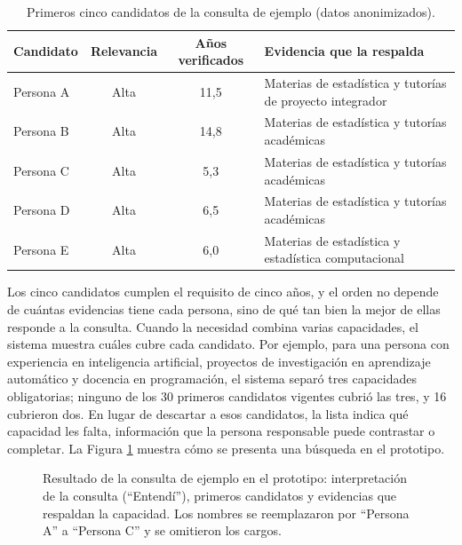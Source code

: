 \begin{table}[!htbp]
    \centering
    \caption{Primeros cinco candidatos de la consulta de ejemplo (datos anonimizados).}
    \label{tab:consulta_resultados}
    \small
    \begin{tabular}{l c c >{\raggedright\arraybackslash}p{7.4cm}}
        \toprule
        \textbf{Candidato} & \textbf{Relevancia} & \textbf{Años verificados} & \textbf{Evidencia que la respalda} \\
        \midrule
        Persona A & Alta & 11,5 & Materias de estadística y tutorías de proyecto integrador \\
        Persona B & Alta & 14,8 & Materias de estadística y tutorías académicas \\
        Persona C & Alta & 5,3 & Materias de estadística y tutorías académicas \\
        Persona D & Alta & 6,5 & Materias de estadística y tutorías académicas \\
        Persona E & Alta & 6,0 & Materias de estadística y estadística computacional \\
        \bottomrule
    \end{tabular}
\end{table}

Los cinco candidatos cumplen el requisito de cinco años, y el orden no depende de cuántas evidencias tiene cada persona, sino de qué tan bien la mejor de ellas responde a la consulta. Cuando la necesidad combina varias capacidades, el sistema muestra cuáles cubre cada candidato. Por ejemplo, para una persona con experiencia en inteligencia artificial, proyectos de investigación en aprendizaje automático y docencia en programación, el sistema separó tres capacidades obligatorias; ninguno de los 30 primeros candidatos vigentes cubrió las tres, y 16 cubrieron dos. En lugar de descartar a esos candidatos, la lista indica qué capacidad les falta, información que la persona responsable puede contrastar o completar. La Figura \ref{fig:busqueda} muestra cómo se presenta una búsqueda en el prototipo.

\begin{figure}[!htbp]
    \centering
    \caption{Resultado de la consulta de ejemplo en el prototipo: interpretación de la consulta (``Entendí''), primeros candidatos y evidencias que respaldan la capacidad. Los nombres se reemplazaron por ``Persona A'' a ``Persona C'' y se omitieron los cargos.}
    \label{fig:busqueda}
\end{figure}

